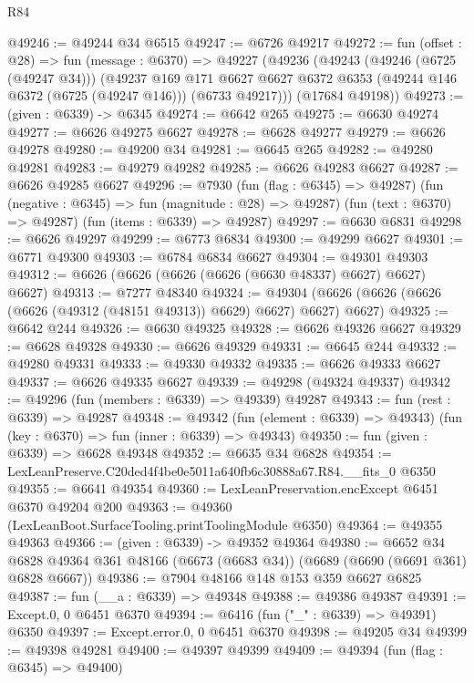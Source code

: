 \begin{lexlean}{R84}
\begin{coremodule}
@49246 := @49244 @34 @6515
@49247 := @6726 @49217
@49272 := fun (offset : @28) =>
  fun (message : @6370) =>
  @49227
    (@49236
      (@49243
        (@49246 (@6725 (@49247 @34)))
        (@49237
          @169
          @171
          @6627
          @6627
          @6372
          @6353
          (@49244 @146 @6372 (@6725 (@49247 @146)))
          (@6733 @49217)))
      (@17684 @49198))
@49273 := (given : @6339) -> @6345
@49274 := @6642 @265
@49275 := @6630 @49274
@49277 := @6626 @49275 @6627
@49278 := @6628 @49277
@49279 := @6626 @49278
@49280 := @49200 @34
@49281 := @6645 @265
@49282 := @49280 @49281
@49283 := @49279 @49282
@49285 := @6626 @49283 @6627
@49287 := @6626 @49285 @6627
@49296 := @7930
    (fun (flag : @6345) => @49287)
    (fun (negative : @6345) => fun (magnitude : @28) => @49287)
    (fun (text : @6370) => @49287)
    (fun (items : @6339) => @49287)
@49297 := @6630 @6831
@49298 := @6626 @49297
@49299 := @6773 @6834
@49300 := @49299 @6627
@49301 := @6771 @49300
@49303 := @6784 @6834 @6627
@49304 := @49301 @49303
@49312 := @6626 (@6626 (@6626 (@6626 (@6630 @48337) @6627) @6627) @6627)
@49313 := @7277 @48340
@49324 := @49304 (@6626 (@6626 (@6626 (@6626 (@49312 (@48151 @49313)) @6629) @6627) @6627) @6627)
@49325 := @6642 @244
@49326 := @6630 @49325
@49328 := @6626 @49326 @6627
@49329 := @6628 @49328
@49330 := @6626 @49329
@49331 := @6645 @244
@49332 := @49280 @49331
@49333 := @49330 @49332
@49335 := @6626 @49333 @6627
@49337 := @6626 @49335 @6627
@49339 := @49298 (@49324 @49337)
@49342 := @49296 (fun (members : @6339) => @49339) @49287
@49343 := fun (rest : @6339) => @49287
@49348 := @49342
    (fun (element : @6339) => @49343)
    (fun (key : @6370) => fun (inner : @6339) => @49343)
@49350 := fun (given : @6339) => @6628 @49348
@49352 := @6635 @34 @6828
@49354 := LexLeanPreserve.C20ded4f4be0e5011a640fb6c30888a67.R84.__fits_0 @6350
@49355 := @6641 @49354
@49360 := LexLeanPreservation.encExcept @6451 @6370 @49204 @200
@49363 := @49360 (LexLeanBoot.SurfaceTooling.printToolingModule @6350)
@49364 := @49355 @49363
@49366 := (given : @6339) -> @49352 @49364
@49380 := @6652
    @34
    @6828
    @49364
    @361
    @48166
    (@6673 (@6683 @34))
    (@6689 (@6690 (@6691 @361) @6828 @6667))
@49386 := @7904 @48166 @148 @153 @359 @6627 @6825
@49387 := fun (__a : @6339) => @49348
@49388 := @49386 @49387
@49391 := Except.{0, 0} @6451 @6370
@49394 := @6416 (fun ("_" : @6339) => @49391) @6350
@49397 := Except.error.{0, 0} @6451 @6370
@49398 := @49205 @34
@49399 := @49398 @49281
@49400 := @49397 @49399
@49409 := @49394
    (fun (flag : @6345) => @49400)

\end{coremodule}
\end{lexlean}
